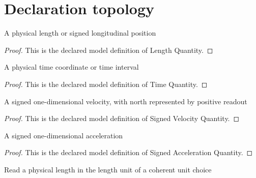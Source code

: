 \section{Declaration topology}
\begin{definition}
  \label{def:physics:phyx-mini-0674:phyxminiproblems-problemphyxmini0674-lengthquantity}
  A physical length or signed longitudinal position
\end{definition}
\begin{proof}
  This is the declared model definition of Length Quantity.
\end{proof}
\begin{definition}
  \label{def:physics:phyx-mini-0674:phyxminiproblems-problemphyxmini0674-timequantity}
  A physical time coordinate or time interval
\end{definition}
\begin{proof}
  This is the declared model definition of Time Quantity.
\end{proof}
\begin{definition}
  \label{def:physics:phyx-mini-0674:phyxminiproblems-problemphyxmini0674-signedvelocityquantity}
  A signed one-dimensional velocity, with north represented by positive readout
\end{definition}
\begin{proof}
  This is the declared model definition of Signed Velocity Quantity.
\end{proof}
\begin{definition}
  \label{def:physics:phyx-mini-0674:phyxminiproblems-problemphyxmini0674-signedaccelerationquantity}
  A signed one-dimensional acceleration
\end{definition}
\begin{proof}
  This is the declared model definition of Signed Acceleration Quantity.
\end{proof}
\begin{definition}
  \label{def:physics:phyx-mini-0674:phyxminiproblems-problemphyxmini0674-lengthreadout}
  Read a physical length in the length unit of a coherent unit choice
\end{definition}
